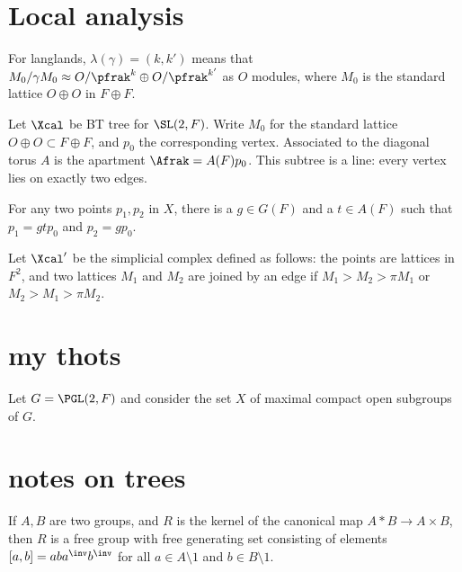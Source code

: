 \documentclass{article}
\begin{document}
\section*{Local analysis}



For langlands, $\lambda(\gamma)= (k,k')$ means that $M_0/\gamma M_0 \approx O/\pfrak^k \oplus O/\pfrak^{k'}$ as $O$ modules, where $M_0$ is the standard lattice $O\oplus O$ in $F \oplus F$.

Let $\Xcal$ be BT tree for $\SL(2,F)$. Write $M_0$ for the standard lattice $O\oplus O \subset F \oplus F$, and $p_0$ the corresponding vertex. Associated to the diagonal torus $A$ is the apartment $\Afrak= A(F)p_0$. This subtree is a line: every vertex lies on exactly two edges.

For any two points $p_1,p_2$ in $X$, there is a $g\in G(F)$  and a $t\in A(F)$ such that $p_1 = g t p_0$ and $p_2 = gp_0$.

Let $\Xcal'$ be the simplicial complex defined as follows: the points are lattices in $F^2$, and two lattices $M_1$ and $M_2$ are joined by an edge if $M_1>M_2 > \pi M_1$ or $M_2>M_1 > \pi M_2$.
\section*{my thots}
Let $G=\PGL(2,F)$ and consider the set $X$ of maximal compact open subgroups of $G$.
\section*{notes on trees}

If $A,B$ are two groups, and $R$ is the kernel of the canonical map $A*B \to A\times B$, then $R$ is a free group with free generating set consisting of elements $[a,b]=aba^\inv b^\inv $ for all $a\in A\setminus 1$ and $b\in B\setminus 1$.
\end{document}
